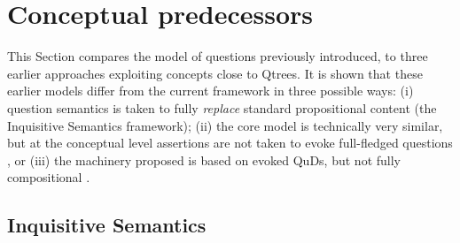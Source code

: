 \section{Conceptual predecessors}\label{chap:lit-review}
This Section compares the model of questions previously introduced, to three earlier approaches exploiting concepts close to Qtrees. It is shown that these earlier models differ from the current framework in three possible ways: (i) question semantics is taken to fully \textit{replace} standard propositional content (the Inquisitive Semantics framework); (ii) the core model is technically very similar, but at the conceptual level assertions are not taken to evoke full-fledged questions \citep{Ippolito2019}, or (iii) the machinery proposed is based on evoked QuDs, but not fully compositional \citep{Zhang2022}.



\subsection{Inquisitive Semantics}

%


